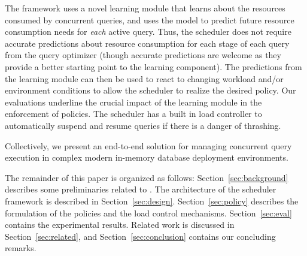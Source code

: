 The framework uses a novel learning module that learns about the resources consumed by concurrent queries, and uses the model to predict future resource consumption needs for \textit{each} active query. 
Thus, the scheduler does not require accurate predictions about resource consumption for each stage of each query from the query optimizer (though accurate predictions are welcome as they provide a better starting point to the learning component). 
The predictions from the learning module can then be used to react to changing workload and/or environment conditions to allow the scheduler to realize the desired policy. 
Our evaluations underline the crucial impact of the learning module in the enforcement of policies.
The scheduler has a built in load controller to automatically suspend and resume queries if there is a danger of thrashing.

Collectively, we present an end-to-end solution for managing concurrent query execution in complex modern in-memory database deployment environments.

The remainder of this paper is organized as follows: Section~\ref{sec:background} describes some preliminaries related to \sys{}. 
The architecture of the scheduler framework is described in Section~\ref{sec:design}. 
Section~\ref{sec:policy} describes the  formulation of the policies and the load control mechanisms.
Section~\ref{sec:eval} contains the experimental results. Related work is discussed in Section~\ref{sec:related}, and Section~\ref{sec:conclusion} contains our concluding remarks.

